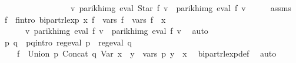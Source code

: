 \begin{isabellebody}
\ \ \ \ \ \ \ \ \ \ \ \ \ \ \ \ {\isasymand}\ {\isacharparenleft}{\kern0pt}{\isasymforall}v{\isachardot}{\kern0pt}\ parikh{\isacharunderscore}{\kern0pt}img\ {\isacharparenleft}{\kern0pt}eval\ {\isacharparenleft}{\kern0pt}Star\ f{\isacharparenright}{\kern0pt}\ v{\isacharparenright}{\kern0pt}\ {\isacharequal}{\kern0pt}\ parikh{\isacharunderscore}{\kern0pt}img\ {\isacharparenleft}{\kern0pt}eval\ f{\isacharprime}{\kern0pt}\ v{\isacharparenright}{\kern0pt}{\isacharparenright}{\kern0pt}{\isachardoublequoteclose}\isanewline
%
\isadelimproof
%
\endisadelimproof
%
\isatagproof
{}\isamarkupfalse%
\ {\isacharminus}{\kern0pt}\isanewline
\ \ \isamarkupfalse%
\ assms\ \isamarkupfalse%
\ f{\isacharprime}{\kern0pt}\ \ f{\isacharprime}{\kern0pt}{\isacharunderscore}{\kern0pt}intro{\isacharcolon}{\kern0pt}\ {\isachardoublequoteopen}bipart{\isacharunderscore}{\kern0pt}rlexp\ x\ f{\isacharprime}{\kern0pt}\ {\isasymand}\ vars\ f{\isacharprime}{\kern0pt}\ {\isacharequal}{\kern0pt}\ vars\ f\ {\isasymunion}\ {\isacharbraceleft}{\kern0pt}x{\isacharbraceright}{\kern0pt}\ {\isasymand}\isanewline
\ \ \ \ \ \ {\isacharparenleft}{\kern0pt}{\isasymforall}v{\isachardot}{\kern0pt}\ parikh{\isacharunderscore}{\kern0pt}img\ {\isacharparenleft}{\kern0pt}eval\ f\ v{\isacharparenright}{\kern0pt}\ {\isacharequal}{\kern0pt}\ parikh{\isacharunderscore}{\kern0pt}img\ {\isacharparenleft}{\kern0pt}eval\ f{\isacharprime}{\kern0pt}\ v{\isacharparenright}{\kern0pt}{\isacharparenright}{\kern0pt}{\isachardoublequoteclose}\ \isamarkupfalse%
\ auto\isanewline
\ \ \isamarkupfalse%
\ \isamarkupfalse%
\ p\ q\ \ p{\isacharunderscore}{\kern0pt}q{\isacharunderscore}{\kern0pt}intro{\isacharcolon}{\kern0pt}\ {\isachardoublequoteopen}reg{\isacharunderscore}{\kern0pt}eval\ p\ {\isasymand}\ reg{\isacharunderscore}{\kern0pt}eval\ q\ {\isasymand}\isanewline
\ \ \ \ f{\isacharprime}{\kern0pt}\ {\isacharequal}{\kern0pt}\ Union\ p\ {\isacharparenleft}{\kern0pt}Concat\ q\ {\isacharparenleft}{\kern0pt}Var\ x{\isacharparenright}{\kern0pt}{\isacharparenright}{\kern0pt}\ {\isasymand}\ {\isacharparenleft}{\kern0pt}{\isasymforall}y\ {\isasymin}\ vars\ p{\isachardot}{\kern0pt}\ y\ {\isasymnoteq}\ x{\isacharparenright}{\kern0pt}{\isachardoublequoteclose}\ \isamarkupfalse%
\ bipart{\isacharunderscore}{\kern0pt}rlexp{\isacharunderscore}{\kern0pt}def\ \isamarkupfalse%
\ auto\isanewline
\isanewline
\ \ \isamarkupfalse%

\end{isabellebody}
